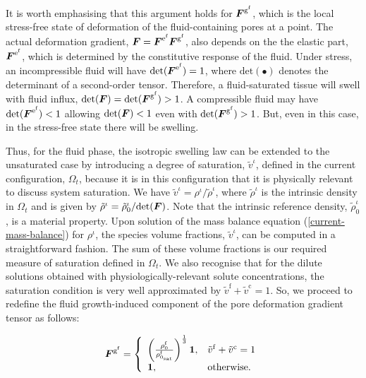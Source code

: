 It is worth emphasising that this argument holds for
$\mbox{\boldmath$ F$}^{\mathrm{g}^\mathrm{f}}$, which is the local stress-free state of
deformation of the fluid-containing pores at a point. The actual
deformation gradient, $\mbox{\boldmath$ F$} =
\mbox{\boldmath$ F$}^{\mathrm{e}^\mathrm{f}}\mbox{\boldmath$ F$}^{\mathrm{g}^\mathrm{f}}$, also depends
on the the elastic part, $\mbox{\boldmath$ F$}^{\mathrm{e}^\mathrm{f}}$, which is
determined by the constitutive response of the fluid. Under stress, an
incompressible fluid will have
$\mathrm{det}(\mbox{\boldmath$ F$}^{\mathrm{e}^\mathrm{f}}) = 1$, where
$\mathrm{det}(\bullet)$ denotes the determinant of a second-order
tensor. Therefore, a fluid-saturated tissue will swell with fluid
influx, \mbox{$\mathrm{det}(\mbox{\boldmath$ F$}) =
  \mathrm{det}(\mbox{\boldmath$ F$}^{\mathrm{g}^\mathrm{f}}) > 1$}. A compressible
fluid may have 
$\mathrm{det}(\mbox{\boldmath$ F$}^{\mathrm{e}^\mathrm{f}}) < 1$ allowing
$\mathrm{det}(\mbox{\boldmath$ F$}) < 1$ even with
$\mathrm{det}(\mbox{\boldmath$ F$}^{\mathrm{g}^\mathrm{f}}) >1$. But, even in this case,
in the stress-free state there will be swelling.

Thus, for the fluid phase, the isotropic swelling law can be extended
to the unsaturated case by introducing a degree of saturation,
$\tilde{v}^\iota$, defined in the current configuration, $\Omega_t$,
because it is in this configuration that it is physically relevant to
discuss system saturation. We have $\tilde{v}^\iota =
\rho^\iota/\tilde{\rho}^\iota$, where $\tilde{\rho}^\iota$ is the
intrinsic density in $\Omega_t$ and is given by $\tilde{\rho}^\iota =
\tilde{\rho}^\iota_0/\mathrm{det}(\mbox{\boldmath$ F$})$. Note that the intrinsic
reference density, $\tilde{\rho}^\iota_0$, is a material
property. Upon solution of the mass balance equation
(\ref{current-mass-balance}) for $\rho^\iota$, the species volume
fractions, $\tilde{v}^\iota$, can be computed in a straightforward
fashion. The sum of these volume fractions is our required measure of
saturation defined in $\Omega_t$. We also recognise that for the
dilute solutions obtained with physiologically-relevant solute
concentrations, the saturation condition is very well approximated by
$\tilde{v}^\mathrm{f} + \tilde{v}^\mathrm{c} = 1$. So, we proceed to
redefine the fluid growth-induced component of the pore deformation
gradient tensor as follows:

\begin{equation}
\mbox{\boldmath$ F$}^{\mathrm{g}^\mathrm{f}} = \left\{ \begin{array}{ll} \left(
  \frac{\rho_0^\mathrm{f}}{\rho_{0_{\mathrm{sat}}}^\mathrm{f}}
  \right)^ {\frac{1}{3}}{\bf 1},& \tilde{v}^\mathrm{f} +
  \tilde{v}^\mathrm{c} = 1 \\ {\bf 1},& \mathrm{otherwise.}
\end{array}\right.
\label{saturation}
\end{equation}

